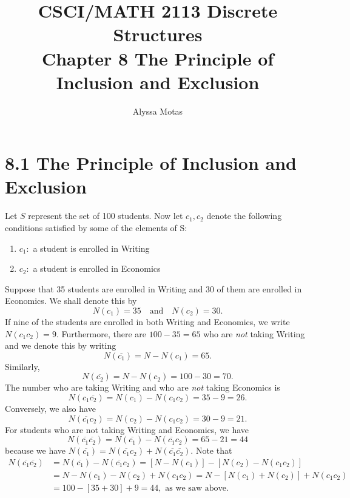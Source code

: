 \documentclass[11pt]{article}
\title{\textbf{CSCI/MATH 2113 Discrete Structures} \\ Chapter 8 The Principle of Inclusion and Exclusion}
\author{Alyssa Motas}
\begin{document}
    \maketitle

    \pagebreak

    \tableofcontents

    \pagebreak

    \section{8.1 The Principle of Inclusion and Exclusion}

    Let $S$ represent the set of 100 students. Now let \(c_1, c_2\) denote the following conditions satisfied by some of the elements of S:
    \begin{enumerate}
        \item[] \(c_1:\) a student is enrolled in Writing
        \item[] \(c_2:\) a student is enrolled in Economics  
    \end{enumerate}
    Suppose that 35 students are enrolled in Writing and 30 of them are enrolled in Economics. We shall denote this by \[N(c_1) = 35 \quad \text{and} \quad N(c_2) = 30.\] If nine of the students are enrolled in both Writing and Economics, we write \(N(c_1 c_2) = 9\). Furthermore, there are \(100-35 = 65\) who are \emph{not} taking Writing and we denote this by writing \[N(\overline{c_1}) = N - N(c_1) = 65.\] Similarly, \[N(\overline{c_2}) = N - N(c_2) = 100 - 30 = 70.\] The number who are taking Writing and who are \emph{not} taking Economics is \[N(c_1 \overline{c_2}) = N(c_1) - N(c_1c_2) = 35 - 9 = 26.\] Conversely, we also have \[N(\overline{c_1}c_2) = N(c_2) - N(c_1 c_2) = 30 - 9 = 21.\] For students who are not taking Writing and Economics, we have \[N(\overline{c_1} \overline{c_2}) = N(\overline{c_1}) - N(\overline{c_1}c_2) = 65 - 21 = 44\] because we have \(N(\overline{c_1}) = N(\overline{c_1}c_2) + N(\overline{c_1}\overline{c_2}).\) Note that
    \begin{align*}
        N(\overline{c_1} \overline{c_2}) &= N(\overline{c_1}) - N(\overline{c_1}c_2) = [N - N(c_1)] - [N(c_2) - N(c_1c_2)] \\
        &= N - N(c_1) - N(c_2) + N(c_1 c_2) = N - [N(c_1) + N(c_2)] + N(c_1c_2) \\
        &= 100 - [35 + 30] + 9 = 44, \text{ as we saw above.}
    \end{align*}

    \pagebreak
\end{document}
